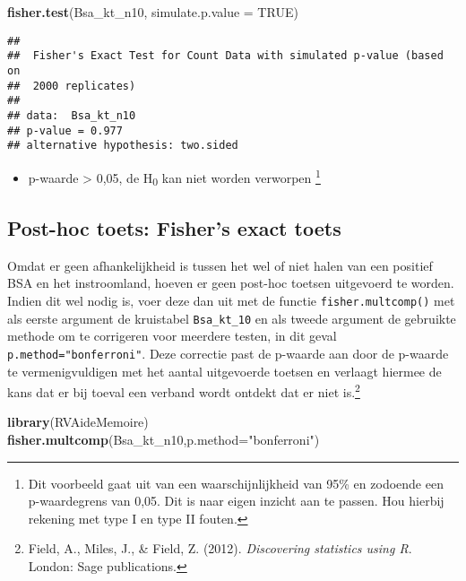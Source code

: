 \documentclass[
]{article}
\newenvironment{Shaded}{\begin{snugshade}}{\end{snugshade}}
\newcommand{\DataTypeTok}[1]{\textcolor[rgb]{0.13,0.29,0.53}{#1}}
\newcommand{\KeywordTok}[1]{\textcolor[rgb]{0.13,0.29,0.53}{\textbf{#1}}}
\newcommand{\NormalTok}[1]{#1}
\newcommand{\OtherTok}[1]{\textcolor[rgb]{0.56,0.35,0.01}{#1}}
\newcommand{\StringTok}[1]{\textcolor[rgb]{0.31,0.60,0.02}{#1}}
\providecommand{\tightlist}{%
  \setlength{\itemsep}{0pt}\setlength{\parskip}{0pt}}
\begin{document}
\begin{Shaded}
\begin{Highlighting}[]
\KeywordTok{fisher.test}\NormalTok{(Bsa_kt_n10, }\DataTypeTok{simulate.p.value =} \OtherTok{TRUE}\NormalTok{)}
\end{Highlighting}
\end{Shaded}

\begin{verbatim}
## 
##  Fisher's Exact Test for Count Data with simulated p-value (based on
##  2000 replicates)
## 
## data:  Bsa_kt_n10
## p-value = 0.977
## alternative hypothesis: two.sided
\end{verbatim}

\begin{itemize}
\tightlist
\item
  p-waarde \textgreater{} 0,05, de H\textsubscript{0} kan niet worden
  verworpen \footnote{Dit voorbeeld gaat uit van een waarschijnlijkheid
    van 95\% en zodoende een p-waardegrens van 0,05. Dit is naar eigen
    inzicht aan te passen. Hou hierbij rekening met type I en type II
    fouten.}
\end{itemize}

\hypertarget{post-hoc-toets-fishers-exact-toets}{%
\subsection{Post-hoc toets: Fisher's exact
toets}\label{post-hoc-toets-fishers-exact-toets}}

Omdat er geen afhankelijkheid is tussen het wel of niet halen van een
positief BSA en het instroomland, hoeven er geen post-hoc toetsen
uitgevoerd te worden. Indien dit wel nodig is, voer deze dan uit met de
functie \texttt{fisher.multcomp()} met als eerste argument de kruistabel
\texttt{Bsa\_kt\_10} en als tweede argument de gebruikte methode om te
corrigeren voor meerdere testen, in dit geval
\texttt{p.method="bonferroni"}. Deze correctie past de p-waarde aan door
de p-waarde te vermenigvuldigen met het aantal uitgevoerde toetsen en
verlaagt hiermee de kans dat er bij toeval een verband wordt ontdekt dat
er niet is.\footnote{Field, A., Miles, J., \& Field, Z. (2012).
  \emph{Discovering statistics using R}. London: Sage publications.}

\begin{Shaded}
\begin{Highlighting}[]
\KeywordTok{library}\NormalTok{(RVAideMemoire)}
\KeywordTok{fisher.multcomp}\NormalTok{(Bsa_kt_n10,}\DataTypeTok{p.method=}\StringTok{"bonferroni"}\NormalTok{)}
\end{Highlighting}
\end{Shaded}
\end{document}
